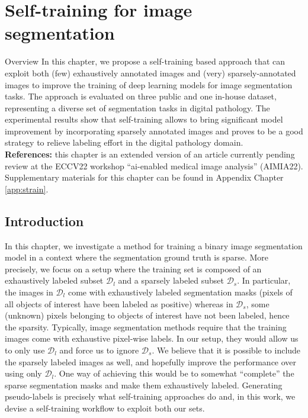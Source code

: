 \chapter{Self-training for image segmentation}
\label{chap:strain}

\begin{overview}{Overview}
  In this chapter, we propose a self-training based approach that can exploit both (few) exhaustively annotated images and (very) sparsely-annotated images to improve the training of deep learning models for image segmentation tasks. The approach is evaluated on three public and one in-house dataset, representing a diverse set of segmentation tasks in digital pathology. The experimental results show that self-training allows to bring significant model improvement by incorporating sparsely annotated images and proves to be a good strategy to relieve labeling effort in the digital pathology domain.\\
  
  \textbf{References:} this chapter is an extended version of an article currently pending review at the ECCV22 workshop ``\acrshort{ai}-enabled medical image analysis'' (AIMIA22). \\
  
  Supplementary materials for this chapter can be found in Appendix Chapter \ref{app:strain}.
  \end{overview}

\section{Introduction}
\label{sec:strain:intro}

In this chapter, we investigate a method for training a binary image segmentation model in a context where the segmentation ground truth is sparse. More precisely, we focus on a setup where the training set is composed of an exhaustively labeled subset $\mathcal{D}_l$ and a sparsely labeled subset $\mathcal{D}_s$. In particular, the images in $\mathcal{D}_l$ come with exhaustively labeled segmentation masks (\ie pixels of all objects of interest have been labeled as positive) whereas in $\mathcal{D}_s$, some (unknown) pixels belonging to objects of interest have not been labeled, hence the sparsity. Typically, image segmentation methods require that the training images come with exhaustive pixel-wise labels. In our setup, they would allow us to only use $\mathcal{D}_l$ and force us to ignore $\mathcal{D}_s$. We believe that it is possible to include the sparsely labeled images as well, and hopefully improve the performance over using only $\mathcal{D}_l$. One way of achieving this would be to somewhat ``complete'' the sparse segmentation masks and make them exhaustively labeled. Generating pseudo-labels is precisely what self-training approaches do and, in this work, we devise a self-training workflow to exploit both our sets.

